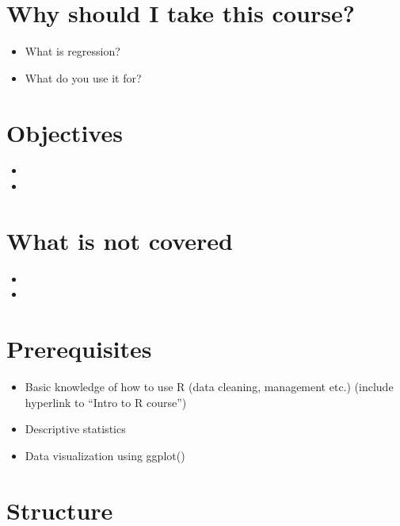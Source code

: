 \documentclass[
]{book}
\providecommand{\tightlist}{%
  \setlength{\itemsep}{0pt}\setlength{\parskip}{0pt}}
\begin{document}
\hypertarget{why-should-i-take-this-course}{%
\section{Why should I take this course?}\label{why-should-i-take-this-course}}

\begin{itemize}
\tightlist
\item
  What is regression?
\item
  What do you use it for?
\end{itemize}

\hypertarget{objectives}{%
\section{Objectives}\label{objectives}}

\begin{itemize}
\tightlist
\item
\item
\end{itemize}

\hypertarget{what-is-not-covered}{%
\section{What is not covered}\label{what-is-not-covered}}

\begin{itemize}
\tightlist
\item
\item
\end{itemize}

\hypertarget{prerequisites}{%
\section{Prerequisites}\label{prerequisites}}

\begin{itemize}
\tightlist
\item
  Basic knowledge of how to use R (data cleaning, management etc.) (include hyperlink to ``Intro to R course'')
\item
  Descriptive statistics
\item
  Data visualization using ggplot()
\end{itemize}

\hypertarget{structure}{%
\section{Structure}\label{structure}}
\end{document}
